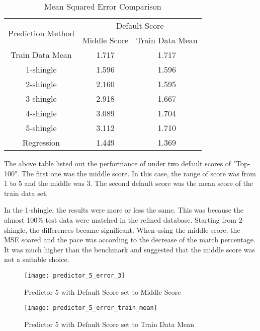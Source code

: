 \begin{table}[H]
\caption{Mean Squared Error Comparison}
		\begin{tabular}{ccc}
			\toprule
				\multirow{2}{*}{Prediction Method} &
				\multicolumn{2}{c}{Default Score}\\
				\cline{2-3}
				& Middle Score & Train Data Mean \\
			\midrule
				Train Data Mean & 1.717 & 1.717 \\
				\hline
				1-shingle & 1.596 & 1.596\\
				2-shingle & 2.160 & 1.595\\
				3-shingle & 2.918 & 1.667\\
				4-shingle & 3.089 & 1.704\\
				5-shingle & 3.112 & 1.710\\
				\hline
				Regression & 1.449 & 1.369\\
				
			\bottomrule
		\end{tabular}

\end{table}

The above table listed out the performance of under two default scores of "Top-100". The first one was the middle score. In this case, the range of score was from 1 to 5 and the middle was 3. The second default score was the mean score of the train data set.

In the 1-shingle, the results were more or less the same. This was because the almost 100\% test data were matched in the refined database. 
Starting from 2-shingle, the differences became significant. When using the middle score, the MSE soared and the pace was according to the decrease of the match percentage. It was much higher than the benchmark and suggested that the middle score was not a suitable choice.


\begin{figure}
\texttt{[image: predictor\_5\_error\_3]}
\caption{Predictor 5 with Default Score set to Middle Score}
\end{figure}

\begin{figure}
\texttt{[image: predictor\_5\_error\_train\_mean]}
\caption{Predictor 5 with Default Score set to Train Data Mean}
\end{figure}

